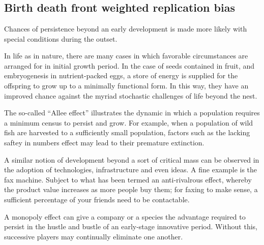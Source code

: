 \noindent


























\chapter{}





\section{Birth death front weighted replication bias}

Chances of persistence beyond an early development is made more likely with special conditions during the outset. 

In life as in nature, there are many cases in which favorable circumstances are arranged for in initial growth period. In the case of seeds contained in fruit, and embryogenesis in nutrient-packed eggs, a store of energy is supplied for the offspring to grow up to a minimally functional form. In this way, they have an improved chance against the myriad stochastic challenges of life beyond the nest.

The so-called ``Allee effect'' illustrates the dynamic in which a population requires a minimum census to persist and grow. For example, when a population of wild fish are harvested to a sufficiently small population, factors such as the lacking saftey in numbers effect may lead to their premature extinction. 

A similar notion of development beyond a sort of critical mass can be observed in the adoption of technologies, infrastructure and even ideas. A fine example is the fax machine. Subject to what has been termed an anti-rivalrous effect, whereby the product value increases as more people buy them; for faxing to make sense, a sufficient percentage of your friends need to be contactable.


A monopoly effect can give a company or a species the advantage required to persist in the hustle and bustle of an early-stage innovative period. Without this, successive players may continually eliminate one another.

